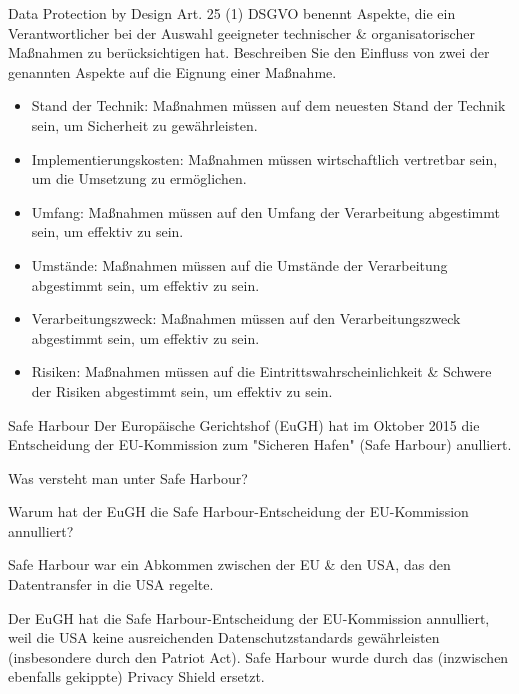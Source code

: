 \documentclass{exercisesheet}
\begin{document}
\begin{exercise}{Data Protection by Design}
  Art. 25 (1) DSGVO benennt Aspekte, die ein Verantwortlicher bei der Auswahl geeigneter technischer \& organisatorischer Maßnahmen zu berücksichtigen hat. Beschreiben Sie den Einfluss von zwei der genannten Aspekte auf die Eignung einer Maßnahme.

  \begin{solution}
    \begin{itemize}
      \item Stand der Technik: Maßnahmen müssen auf dem neuesten Stand der Technik sein, um Sicherheit zu gewährleisten.
      \item Implementierungskosten: Maßnahmen müssen wirtschaftlich vertretbar sein, um die Umsetzung zu ermöglichen.
      \item Umfang: Maßnahmen müssen auf den Umfang der Verarbeitung abgestimmt sein, um effektiv zu sein.
      \item Umstände: Maßnahmen müssen auf die Umstände der Verarbeitung abgestimmt sein, um effektiv zu sein.
      \item Verarbeitungszweck: Maßnahmen müssen auf den Verarbeitungszweck abgestimmt sein, um effektiv zu sein.
      \item Risiken: Maßnahmen müssen auf die Eintrittswahrscheinlichkeit \& Schwere der Risiken abgestimmt sein, um effektiv zu sein.
    \end{itemize}
  \end{solution}
\end{exercise}

\begin{eexercises}{Safe Harbour}{
    Der Europäische Gerichtshof (EuGH) hat im Oktober 2015 die Entscheidung der EU-Kommission zum "Sicheren Hafen" (Safe Harbour) anulliert.
  }
  \item Was versteht man unter Safe Harbour?
  \item Warum hat der EuGH die Safe Harbour-Entscheidung der EU-Kommission annulliert?
\end{eexercises}

\begin{solutions}
  \item Safe Harbour war ein Abkommen zwischen der EU \& den USA, das den Datentransfer in die USA regelte.
  \item Der EuGH hat die Safe Harbour-Entscheidung der EU-Kommission annulliert, weil die USA keine ausreichenden Datenschutzstandards gewährleisten (insbesondere durch den Patriot Act). Safe Harbour wurde durch das (inzwischen ebenfalls gekippte) Privacy Shield ersetzt.
\end{solutions}
\end{document}
